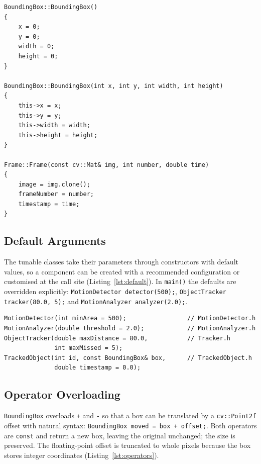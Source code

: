 \documentclass[12pt,a4paper,oneside]{book}
\begin{document}
\begin{minipage}{\linewidth}
\begin{lstlisting}[caption={Overloaded constructors of \texttt{BoundingBox} and \texttt{Frame}.}, label={lst:ctor}]
BoundingBox::BoundingBox()
{
    x = 0;
    y = 0;
    width = 0;
    height = 0;
}

BoundingBox::BoundingBox(int x, int y, int width, int height)
{
    this->x = x;
    this->y = y;
    this->width = width;
    this->height = height;
}

Frame::Frame(const cv::Mat& img, int number, double time)
{
    image = img.clone();
    frameNumber = number;
    timestamp = time;
}
\end{lstlisting}
\end{minipage}

\subsection{Default Arguments}
The tunable classes take their parameters through constructors with default values, so a component can be created with a recommended configuration or customised at the call site (Listing~\ref{lst:default}). In \texttt{main()} the defaults are overridden explicitly: \texttt{MotionDetector detector(500);}, \texttt{ObjectTracker tracker(80.0, 5);} and \texttt{MotionAnalyzer analyzer(2.0);}.

\begin{minipage}{\linewidth}
\begin{lstlisting}[caption={Constructors with default arguments (declarations).}, label={lst:default}]
MotionDetector(int minArea = 500);                 // MotionDetector.h
MotionAnalyzer(double threshold = 2.0);            // MotionAnalyzer.h
ObjectTracker(double maxDistance = 80.0,           // Tracker.h
              int maxMissed = 5);
TrackedObject(int id, const BoundingBox& box,      // TrackedObject.h
              double timestamp = 0.0);
\end{lstlisting}
\end{minipage}

\subsection{Operator Overloading}
\texttt{BoundingBox} overloads \texttt{+} and \texttt{-} so that a box can be translated by a \texttt{cv::Point2f} offset with natural syntax: \texttt{BoundingBox moved = box + offset;}. Both operators are \texttt{const} and return a new box, leaving the original unchanged; the size is preserved. The floating-point offset is truncated to whole pixels because the box stores integer coordinates (Listing~\ref{lst:operators}).
\end{document}
